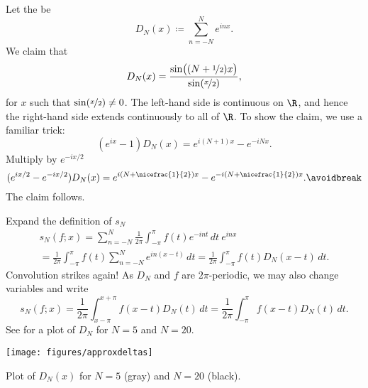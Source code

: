 Let the \emph{} be
\begin{equation*}
D_N(x) \coloneqq \sum_{n=-N}^N e^{inx} .
\end{equation*}
We claim that
\begin{equation*}
D_N(x) =
\frac{\sin\bigl( (N+\nicefrac{1}{2})x \bigr)}{\sin(\nicefrac{x}{2})} ,
\end{equation*}
for $x$ such that $\sin(\nicefrac{x}{2}) \not= 0$.  The left-hand
side is continuous on $\R$, and hence the right-hand side extends continuously to
all of $\R$.
To show the claim,
we use a familiar trick:
\begin{equation*}
(e^{ix}-1) D_N(x) = e^{i(N+1)x} - e^{-iNx} .
\end{equation*}
Multiply by $e^{-ix/2}$
\begin{equation*}
(e^{ix/2}-e^{-ix/2}) D_N(x) = e^{i(N+\nicefrac{1}{2})x} -
e^{-i(N+\nicefrac{1}{2})x} .
\avoidbreak
\end{equation*}
The claim follows.

Expand the definition of $s_N$
\begin{multline*}
s_N(f;x) = 
\sum_{n=-N}^N \frac{1}{2\pi} \int_{-\pi}^\pi f(t) e^{-int}  \,  dt ~ e^{inx}
\\
=
\frac{1}{2\pi} \int_{-\pi}^\pi f(t) \sum_{n=-N}^N e^{in(x-t)} \, dt
=
\frac{1}{2\pi} \int_{-\pi}^\pi f(t) D_N(x-t) \, dt .
\end{multline*}
Convolution strikes again!
As $D_N$ and $f$ are $2\pi$-periodic, we may also change variables and write 
\begin{equation*}
s_N(f;x) = 
\frac{1}{2\pi} \int_{x-\pi}^{x+\pi} f(x-t) D_N(t) \, dt
=
\frac{1}{2\pi} \int_{-\pi}^\pi f(x-t) D_N(t) \, dt .
\end{equation*}
See  for a plot of $D_N$ for $N=5$ and $N=20$.

\begin{myfigureht}
\texttt{[image: figures/approxdeltas]}
\caption{Plot of $D_N(x)$ for $N=5$ (gray) and $N=20$
(black).\label{fig:approxdeltas}}
\end{myfigureht}

